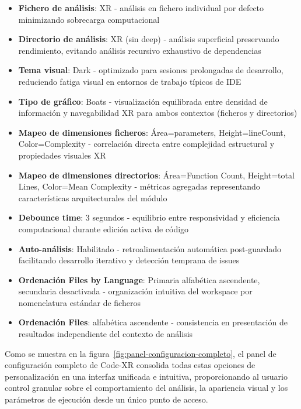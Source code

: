 \documentclass[a4paper, 12pt]{book}
\begin{document}
\begin{itemize}
\begin{itemize}
  \item \textbf{Fichero de análisis}: XR - análisis en fichero individual por defecto minimizando sobrecarga computacional
  \item \textbf{Directorio de análisis}: XR (sin deep) - análisis superficial preservando rendimiento, evitando análisis recursivo exhaustivo de dependencias
  \item \textbf{Tema visual}: Dark - optimizado para sesiones prolongadas de desarrollo, reduciendo fatiga visual en entornos de trabajo típicos de IDE
  \item \textbf{Tipo de gráfico}: Boats - visualización equilibrada entre densidad de información y navegabilidad XR para ambos contextos (ficheros y directorios)
  \item \textbf{Mapeo de dimensiones ficheros}: Área=parameters, Height=lineCount, Color=Complexity - correlación directa entre complejidad estructural y propiedades visuales XR
  \item \textbf{Mapeo de dimensiones directorios}: Área=Function Count, Height=total Lines, Color=Mean Complexity - métricas agregadas representando características arquitecturales del módulo
  \item \textbf{Debounce time}: 3 segundos - equilibrio entre responsividad y eficiencia computacional durante edición activa de código
  \item \textbf{Auto-análisis}: Habilitado - retroalimentación automática post-guardado facilitando desarrollo iterativo y detección temprana de issues
  \item \textbf{Ordenación Files by Language}: Primaria alfabética ascendente, secundaria desactivada - organización intuitiva del workspace por nomenclatura estándar de ficheros
  \item \textbf{Ordenación Files}: alfabética ascendente - consistencia en presentación de resultados independiente del contexto de análisis
\end{itemize}
\end{itemize}

Como se muestra en la figura~\ref{fig:panel-configuracion-completo}, el panel de configuración completo de Code-XR consolida todas estas opciones de personalización en una interfaz unificada e intuitiva, proporcionando al usuario control granular sobre el comportamiento del análisis, la apariencia visual y los parámetros de ejecución desde un único punto de acceso.
\end{document}
